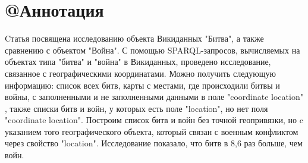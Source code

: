 \section{@Аннотация}

Cтатья посвящена исследованию объекта Викиданных "Битва", а также сравнению с объектом "Война". С помощью SPARQL-запросов, вычисляемых на объектах типа "битва" и "война" в Викиданных, проведено исследование, связанное с географическими координатами. Можно получить следующую информацию: список всех битв, карты с местами, где происходили битвы и войны, с заполненными и не заполненными данными в поле "coordinate location" , также списки битв и войн, у которых есть поле "location", но нет поля "coordinate location". Построим список битв и войн без точной геопривязки, но c указанием того географического объекта, который связан с военным конфликтом через свойство "location". Исследование показало, что битв в 8,6 раз больше, чем войн.